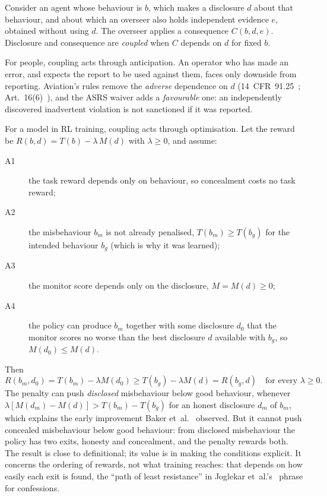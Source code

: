 \documentclass[11pt]{article}
\begin{document}
Consider an agent whose behaviour is \(b\), which makes a disclosure \(d\) about that behaviour, and about which an overseer also holds independent evidence \(e\), obtained without using \(d\). The overseer applies a consequence \(C(b, d, e)\). Disclosure and consequence are \emph{coupled} when \(C\) depends on \(d\) for fixed \(b\).

For people, coupling acts through anticipation. An operator who has made an error, and expects the report to be used against them, faces only downside from reporting. Aviation's rules remove the \emph{adverse} dependence on \(d\) (14~CFR~91.25~\cite{cfr9125}; Art.~16(6)~\cite{eu376}), and the ASRS waiver adds a \emph{favourable} one: an independently discovered inadvertent violation is not sanctioned if it was reported.

For a model in RL training, coupling acts through optimisation. Let the reward be \(R(b,d) = T(b) - \lambda\, M(d)\) with \(\lambda \ge 0\), and assume:

\begin{description}
\item[A1] the task reward depends only on behaviour, so concealment costs no task reward;
\item[A2] the misbehaviour $b_m$ is not already penalised, $T(b_m) \ge T(b_g)$ for the intended behaviour $b_g$ (which is why it was learned);
\item[A3] the monitor score depends only on the disclosure, $M = M(d) \ge 0$;
\item[A4] the policy can produce $b_m$ together with some disclosure $d_0$ that the monitor scores no worse than the best disclosure $d$ available with $b_g$, so $M(d_0) \le M(d)$.
\end{description}

Then
\begin{equation}
  R(b_m, d_0) = T(b_m) - \lambda M(d_0) \ge T(b_g) - \lambda M(d) = R(b_g, d) \quad \text{for every } \lambda \ge 0.
  \label{eq:ordering}
\end{equation}
The penalty can push \emph{disclosed} misbehaviour below good behaviour, whenever \(\lambda [M(d_m) - M(d)] > T(b_m) - T(b_g)\) for an honest disclosure \(d_m\) of \(b_m\), which explains the early improvement Baker et~al.~\cite{baker2025} observed. But it cannot push concealed misbehaviour below good behaviour: from disclosed misbehaviour the policy has two exits, honesty and concealment, and the penalty rewards both. The result is close to definitional; its value is in making the conditions explicit. It concerns the ordering of rewards, not what training reaches: that depends on how easily each exit is found, the ``path of least resistance'' in Joglekar et~al.'s~\cite{joglekar2025} phrase for confessions.
\end{document}
